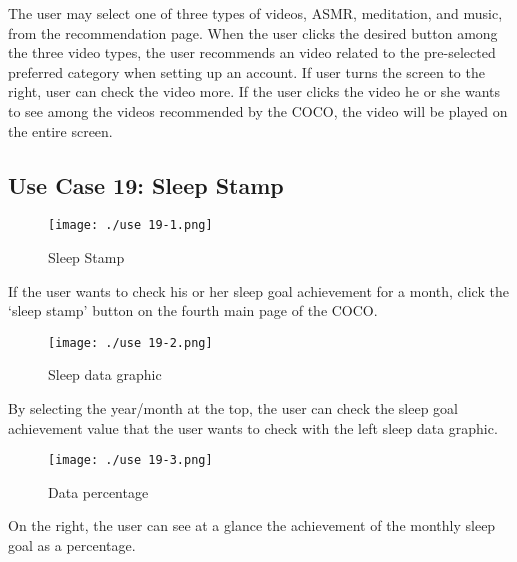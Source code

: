 \documentclass[conference]{IEEEtran}
\begin{document}
The user may select one of three types of videos, ASMR, meditation, and music, from the recommendation page. When the user clicks the desired button among the three video types, the user recommends an video related to the pre-selected preferred category when setting up an account. If user turns the screen to the right, user can check the video more. If the user clicks the video he or she wants to see among the videos recommended by the COCO, the video will be played on the entire screen.

\subsection{Use Case 19: Sleep Stamp}

\begin{figure}[H]
\texttt{[image: ./use 19-1.png]}
\centering
\caption{Sleep Stamp}
\end{figure}

If the user wants to check his or her sleep goal achievement for a month, click the ‘sleep stamp’ button on the fourth main page of the COCO.

\begin{figure}[H]
\texttt{[image: ./use 19-2.png]}
\centering
\caption{Sleep data graphic}
\end{figure}

By selecting the year/month at the top, the user can check the sleep goal achievement value that the user wants to check with the left sleep data graphic.

\begin{figure}[H]
\texttt{[image: ./use 19-3.png]}
\centering
\caption{Data percentage}
\end{figure}

On the right, the user can see at a glance the achievement of the monthly sleep goal as a percentage.
\end{document}
